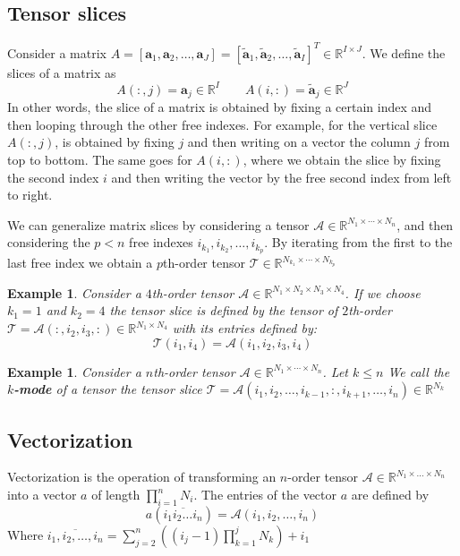 \documentclass[11pt,a4paper,openright,oneside]{book}
\numberwithin{equation}{section}
\newtheorem{example0}[defn0]{Example}
\newenvironment{example}{ \begin{example0}\rm}{\end{example0}}
\begin{document}
\subsection*{Tensor slices}
Consider a matrix $A = [\mathbf{a}_1, \mathbf{a}_2, \dots, \mathbf{a}_J] = [\mathbf{\tilde a}_1, \mathbf{\tilde a}_2, \dots, \mathbf{\tilde a}_I]^T \in \mathbb{R}^{I \times J}$. We define the slices of a matrix
as $$A(:, j) = \mathbf{a}_j \in \mathbb{R}^I \qquad A(i, :) = \mathbf{\tilde{a}}_j \in \mathbb{R}^J$$
In other words, the slice of a matrix is obtained by fixing a certain index and then looping through the other
free indexes. For example, for the vertical slice $A(:, j)$, is obtained by fixing $j$ and then writing on a vector
the column $j$ from top to bottom. The same goes for $A(i, :)$, where we obtain the slice by fixing the second
index $i$ and then writing the vector by the free second index from left to right.

We can generalize matrix slices by considering a tensor $\mathcal{A} \in \mathbb{R}^{N_1 \times \cdots \times N_n}$, and then
considering the $p < n$ free indexes $i_{k_1}, i_{k_2}, \dots, i_{k_p}$. By iterating from the first to the last free index
we obtain a $p$th-order tensor $\mathcal{T} \in \mathbb{R}^{N_{k_1} \times \cdots \times N_{k_p}}$

\begin{example}
    Consider a $4$th-order tensor $\mathcal{A} \in \mathbb{R}^{N_1 \times N_2 \times N_3 \times N_4}$. If we choose $k_1 = 1$ and
    $k_2 = 4$ the tensor slice is defined by the tensor of $2$th-order $\mathcal{T} = \mathcal{A}(:, i_2, i_3, :) \in \mathbb{R}^{N_1 \times N_4}$ with its entries defined by:
    $$\mathcal{T}(i_1, i_4) = \mathcal{A}(i_1, i_2, i_3, i_4)$$
\end{example}

\begin{example}
    Consider a $n$th-order tensor $\mathcal{A} \in \mathbb{R}^{N_1 \times \cdots \times N_n}$. Let $k \leqslant n$ We call the \textbf{$k$-mode} of a tensor
    the tensor slice $\mathcal{T} = \mathcal{A}(i_1, i_2, \dots, i_{k-1}, :, i_{k+1}, \dots, i_n) \in \mathbb{R}^{N_k}$
\end{example}

\subsection*{Vectorization}

Vectorization is the operation of transforming an $n$-order tensor $\mathcal{A} \in \mathbb{R}^{N_1 \times \dots \times N_n}$
into a vector $a$ of length $\prod_{i=1}^{n} N_i$. The entries of the vector $a$ are defined by $$a(\overline{i_1 i_2 \dots i_n}) = 
\mathcal{A}(i_1, i_2, \dots, i_n)$$
Where $\overline {i_1, i_2, \dots, i_n} = \sum_{j=2}^{n} \left( (i_j - 1) \prod_{k=1}^j N_k \right) + i_1$
\end{document}
